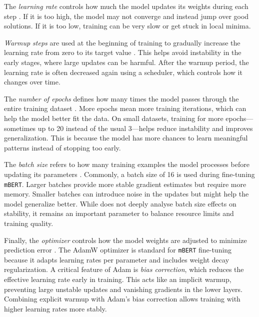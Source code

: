     The \textit{learning rate} controls how much the model updates its weights during each step \parencite{mosbachStabilityFinetuningBERT2021}. If it is too high, the model may not converge and instead jump over good solutions. If it is too low, training can be very slow or get stuck in local minima.

    \textit{Warmup steps} are used at the beginning of training to gradually increase the learning rate from zero to its target value \parencite{mosbachStabilityFinetuningBERT2021}. This helps avoid instability in the early stages, where large updates can be harmful. After the warmup period, the learning rate is often decreased again using a scheduler, which controls how it changes over time.

    The \textit{number of epochs} defines how many times the model passes through the entire training dataset \parencite{mosbachStabilityFinetuningBERT2021}. More epochs mean more training iterations, which can help the model better fit the data. On small datasets, training for more epochs—sometimes up to 20 instead of the usual 3—helps reduce instability and improves generalization. This is because the model has more chances to learn meaningful patterns instead of stopping too early.

    The \textit{batch size} refers to how many training examples the model processes before updating its parameters \parencite{mosbachStabilityFinetuningBERT2021}. Commonly, a batch size of 16 is used during fine-tuning \texttt{mBERT}. Larger batches provide more stable gradient estimates but require more memory. Smaller batches can introduce noise in the updates but might help the model generalize better. While \textcite{mosbachStabilityFinetuningBERT2021} does not deeply analyse batch size effects on stability, it remains an important parameter to balance resource limits and training quality.

    Finally, the \textit{optimizer} controls how the model weights are adjusted to minimize prediction error \parencite{mosbachStabilityFinetuningBERT2021}. The AdamW optimizer is standard for \texttt{mBERT} fine-tuning because it adapts learning rates per parameter and includes weight decay regularization. A critical feature of Adam is \textit{bias correction}, which reduces the effective learning rate early in training. This acts like an implicit warmup, preventing large unstable updates and vanishing gradients in the lower layers. Combining explicit warmup with Adam’s bias correction allows training with higher learning rates more stably.

